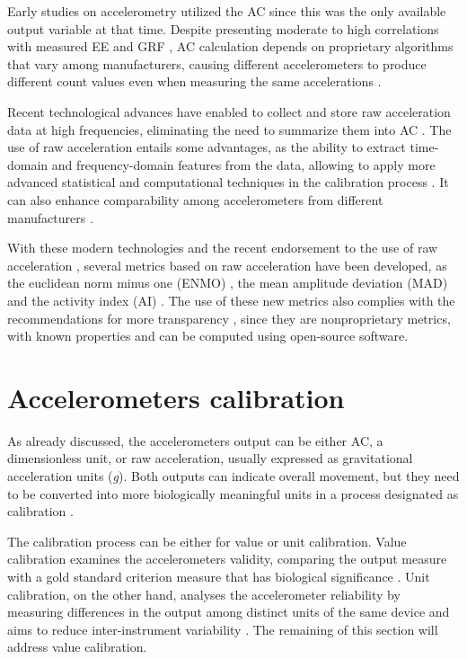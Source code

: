 \documentclass[12pt]{article}
\begin{document}
Early studies on accelerometry utilized the AC since this was the only available output variable at that time. Despite presenting moderate to high correlations with measured EE  and GRF , AC calculation depends on proprietary algorithms that vary among manufacturers, causing different accelerometers to produce different count values even when measuring the same accelerations .

Recent technological advances have enabled to collect and store raw acceleration data at high frequencies, eliminating the need to summarize them into AC . The use of raw acceleration entails some advantages, as the ability to extract time-domain and frequency-domain features from the data, allowing to apply more advanced statistical and computational techniques in the calibration process . It can also enhance comparability among accelerometers from different manufacturers .

With these modern technologies and the recent endorsement to the use of raw acceleration , several metrics based on raw acceleration have been developed, as the euclidean norm minus one (ENMO) , the mean amplitude deviation (MAD)  and the activity index (AI) . The use of these new metrics also complies with the recommendations for more transparency , since they are nonproprietary metrics, with known properties and can be computed using open-source software.

\section*{Accelerometers calibration}

As already discussed, the accelerometers output can be either AC, a dimensionless unit, or raw acceleration, usually expressed as gravitational acceleration units (\textit{g}). Both outputs can indicate overall movement, but they need to be converted into more biologically meaningful units in a process designated as calibration .

The calibration process can be either for value or unit calibration. Value calibration examines the accelerometers validity, comparing the output measure with a gold standard criterion measure that has biological significance . Unit calibration, on the other hand, analyses the accelerometer reliability by measuring differences in the output among distinct units of the same device and aims to reduce inter-instrument variability . The remaining of this section will address value calibration.
\end{document}
